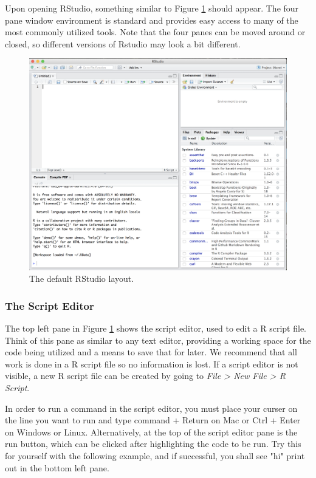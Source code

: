 Upon opening \textsf{RStudio}, something similar to Figure \ref{fig:rstudio} should appear.  The four pane window environment is standard and provides easy access to many of the most commonly utilized tools.  Note that the four panes can be moved around or closed, so different versions of \textsf{Rstudio} may look a bit different.  
\begin{figure}[h!]
\centering
\includegraphics[width = 6in]{chapters/chapter_0/rstudio.png}
\caption{The default \textsf{RStudio} layout.  }
\label{fig:rstudio}
\end{figure}

\subsubsection{The Script Editor}
The top left pane in Figure \ref{fig:rstudio} shows the script editor, used to edit a \textsf{R} script file.  Think of this pane as similar to any text editor, providing a working space for the code being utilized and a means to save that for later.  We recommend that all work is done in a \textsf{R} script file so no information is lost.  If a script editor is not visible, a new \textsf{R} script file can be created by going to \textit{File > New File > R Script}.  

In order to run a command in the script editor, you must place your curser on the line you want to run and type \textsf{command + Return} on Mac or \textsf{Ctrl + Enter} on Windows or Linux.  Alternatively, at the top of the script editor pane is the run button, which can be clicked after highlighting the code to be run.  Try this for yourself with the following example, and if successful, you shall see "hi" print out in the bottom left pane.  

